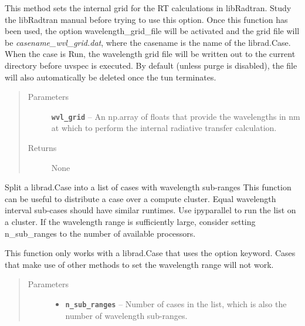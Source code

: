 \documentclass[a4paper,10pt,english]{sphinxmanual}
\begin{document}
\begin{fulllineitems}
\begin{fulllineitems}
This method sets the internal grid for the RT calculations in libRadtran. Study the libRadtran manual
before trying to use this option. Once this function has been used, the option wavelength\_grid\_file
will be activated and the grid file will be \emph{casename\_wvl\_grid.dat}, where the casename is the name of
the librad.Case. When the case is Run, the wavelength grid file will be written out to the current
directory before uvspec is executed. By default (unless purge is disabled), the file will also
automatically be deleted once the tun terminates.
\begin{quote}\begin{description}
\item[{Parameters}] \leavevmode
\textbf{\texttt{wvl\_grid}} -- An np.array of floats that provide the wavelengths in nm at which to perform the
internal radiative transfer calculation.

\item[{Returns}] \leavevmode
None

\end{description}\end{quote}

\end{fulllineitems}


\begin{fulllineitems}
\label{packages:librad.Case.split_case_by_wavelength}
Split a librad.Case into a list of cases with wavelength sub-ranges
This function can be useful to distribute a case over a compute cluster. Equal wavelength interval sub-cases
should have similar runtimes. Use ipyparallel to run the list on a cluster. If the wavelength range
is sufficiently large, consider setting n\_sub\_ranges to the number of available processors.

This function only works with a librad.Case that uses the  option keyword. Cases that make use of
other methods to set the wavelength range will not work.
\begin{quote}\begin{description}
\item[{Parameters}] \leavevmode\begin{itemize}
\item {} 
\textbf{\texttt{n\_sub\_ranges}} -- Number of cases in the list, which is also the number of wavelength sub-ranges.


\end{itemize}
\end{description}
\end{quote}
\end{fulllineitems}
\end{fulllineitems}
\end{document}
